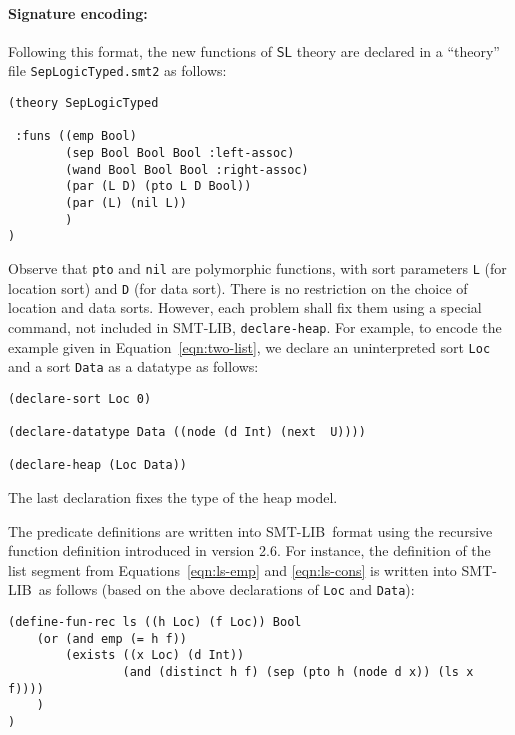 \documentclass[orivec]{llncs}
\newcommand{\seplog}{\mathsf{SL}}
\newcommand{\smtlib}{\textsf{SMT-LIB}}
\begin{document}
\paragraph{Signature encoding:}
Following this format, the new functions of $\seplog$ theory are declared in
a ``theory'' file \texttt{SepLogicTyped.smt2} as follows:
\begin{Verbatim}
(theory SepLogicTyped

 :funs ((emp Bool)
        (sep Bool Bool Bool :left-assoc)
        (wand Bool Bool Bool :right-assoc)
        (par (L D) (pto L D Bool))
        (par (L) (nil L))
        )
)
\end{Verbatim}
Observe that {\tt pto} and {\tt nil} are polymorphic functions, with
sort parameters {\tt L} (for location sort) and {\tt D} (for data sort). 
There is no restriction on the choice of location and data sorts.
However, each problem shall fix them using a special command,
not included in \smtlib, {\tt declare-heap}.
For example, to encode the example given in Equation~\ref{eqn:two-list},
we declare an uninterpreted sort \texttt{Loc} and 
a sort \texttt{Data} as a datatype as follows:
\begin{Verbatim}
(declare-sort Loc 0)

(declare-datatype Data ((node (d Int) (next  U))))

(declare-heap (Loc Data))
\end{Verbatim}
The last declaration fixes the type of the heap model.

The predicate definitions are written into \smtlib\ format using the recursive
function definition introduced in version 2.6. For instance, the definition 
of the list segment from Equations~\ref{eqn:ls-emp} and \ref{eqn:ls-cons} is
written into \smtlib\ as follows (based on the above declarations of 
\texttt{Loc} and \texttt{Data}):
\begin{Verbatim}
(define-fun-rec ls ((h Loc) (f Loc)) Bool
    (or (and emp (= h f))
        (exists ((x Loc) (d Int)) 
                (and (distinct h f) (sep (pto h (node d x)) (ls x f))))
    )
)
\end{Verbatim}
\end{document}
